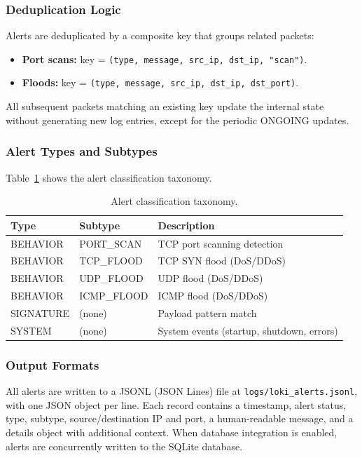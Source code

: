 \documentclass[12pt,a4paper]{article}
\begin{document}
\subsubsection{Deduplication Logic}

Alerts are deduplicated by a composite key that groups related packets:
\begin{itemize}
    \item \textbf{Port scans:} key = \texttt{(type, message, src\_ip, dst\_ip, "scan")}.
    \item \textbf{Floods:} key = \texttt{(type, message, src\_ip, dst\_ip, dst\_port)}.
\end{itemize}
All subsequent packets matching an existing key update the internal state without generating new log entries, except for the periodic ONGOING updates.

\subsubsection{Alert Types and Subtypes}

Table~\ref{tab:alert_types} shows the alert classification taxonomy.

\begin{table}[H]
\centering
\caption{Alert classification taxonomy.}
\label{tab:alert_types}
\begin{tabular}{llp{5.5cm}}
\toprule
\textbf{Type} & \textbf{Subtype} & \textbf{Description} \\
\midrule
BEHAVIOR  & PORT\_SCAN  & TCP port scanning detection \\
BEHAVIOR  & TCP\_FLOOD  & TCP SYN flood (DoS/DDoS) \\
BEHAVIOR  & UDP\_FLOOD  & UDP flood (DoS/DDoS) \\
BEHAVIOR  & ICMP\_FLOOD & ICMP flood (DoS/DDoS) \\
SIGNATURE & (none)      & Payload pattern match \\
SYSTEM    & (none)      & System events (startup, shutdown, errors) \\
\bottomrule
\end{tabular}
\end{table}

\subsubsection{Output Formats}

All alerts are written to a JSONL (JSON Lines) file at \texttt{logs/loki\_alerts.jsonl}, with one JSON object per line. Each record contains a timestamp, alert status, type, subtype, source/destination IP and port, a human-readable message, and a details object with additional context. When database integration is enabled, alerts are concurrently written to the SQLite database.
\end{document}
